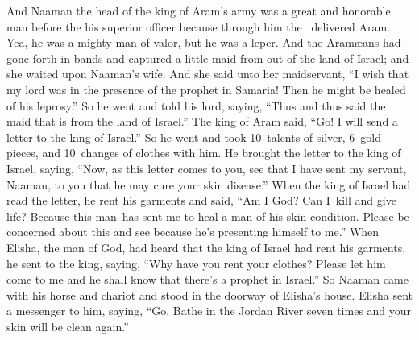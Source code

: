 
\begin{inparaenum}
   And Naaman the head of the king of Aram's army was a great and honorable man before the his superior officer because through him the \lord\ delivered Aram. Yea, he was a mighty man of valor, but he was a leper.%
   And the Aram\ae{}ans had gone forth in bands and captured a little maid from out of the land of Israel; and she waited upon Naaman's wife.%
   And she said unto her maidservant, ``I wish that my lord was in the presence of the prophet in Samaria! Then he might be healed of his leprosy.''%
   So he went and told his lord, saying, ``Thus and thus said the maid that is from the land of Israel.''%
   The king of Aram said, ``Go! I will send a letter to the king of Israel.'' So he went and took 10~talents of silver, 6~gold pieces, and 10~changes of clothes with him.%
   He brought the letter to the king of Israel, saying, ``Now, as this letter comes to you, see that I have sent my servant, Naaman, to you that he may cure your skin disease.''%
   When the king of Israel had read the letter, he rent his garments and said, ``Am I God? Can I\understood{}\ kill and give life? Because this man\understood{}\ has sent me to heal a man of his skin condition. Please be concerned about this and see because he's presenting himself to me.''%
   When Elisha, the man of God, had heard that the king of Israel had rent his garments, he sent to the king, saying, ``Why have you rent your clothes? Please let him come to me and he shall know that there's a prophet in Israel.''%
   So Naaman came with his horse and chariot and stood in the doorway of Elisha's house.%
   Elisha sent a messenger to him, saying, ``Go. Bathe in the Jordan River seven times and your skin will be clean again.''%

\end{inparaenum}
